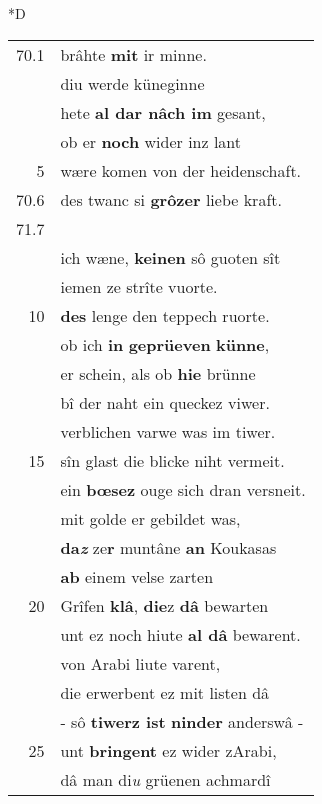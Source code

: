 \documentclass[8pt,a4paper,notitlepage]{article}
\begin{document}
\begin{table}[ht]
\begin{minipage}[t]{0.5\linewidth}
\small
\begin{center}*D
\end{center}
\begin{tabular}{rl}
70.1 & brâhte \textbf{mit} ir minne.\\ 
 & diu werde küneginne\\ 
 & hete \textbf{al dar nâch im} gesant,\\ 
 & ob er \textbf{noch} wider inz lant\\ 
5 & wære komen von der heidenschaft.\\ 
70.6 & des twanc si \textbf{grôzer} liebe kraft.\\ 
71.7 & \textbf{\textit{\begin{large}E\end{large}}in} wâpenroc was harte wît.\\ 
 & ich wæne, \textbf{keinen} sô guoten sît\\ 
 & iemen ze strîte vuorte.\\ 
10 & \textbf{des} lenge den teppech ruorte.\\ 
 & ob ich \textbf{in} \textbf{geprüeven} \textbf{künne},\\ 
 & er schein, als ob \textbf{hie} brünne\\ 
 & bî der naht ein queckez viwer.\\ 
 & verblichen varwe was im tiwer.\\ 
15 & sîn glast die blicke niht vermeit.\\ 
 & ein \textbf{bœsez} ouge sich dran versneit.\\ 
 & mit golde er gebildet was,\\ 
 & \textbf{da\textit{z}} ze\textbf{r} muntâne \textbf{an} Koukasas\\ 
 & \textbf{ab} einem velse zarten\\ 
20 & Grîfen \textbf{klâ}, \textbf{die}z \textbf{dâ} bewarten\\ 
 & unt ez noch hiute \textbf{al dâ} bewarent.\\ 
 & von Arabi liute varent,\\ 
 & die erwerbent ez mit listen dâ\\ 
 & - sô \textbf{tiwerz ist} \textbf{ninder} anderswâ -\\ 
25 & unt \textbf{bringent} ez wider zArabi,\\ 
 & dâ man di\textit{u} grüenen achmardî\\ 

\end{tabular}
\end{minipage}
\end{table}
\end{document}
